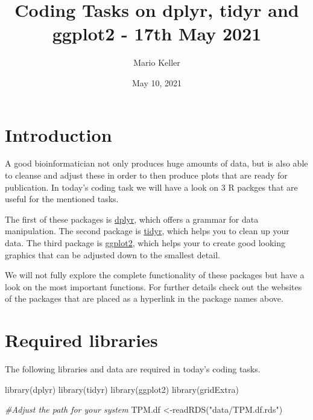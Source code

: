 \documentclass[
  7pt,
]{article}
\title{Coding Tasks on dplyr, tidyr and ggplot2 - 17th May 2021}
\author{Mario Keller}
\date{May 10, 2021}
\newenvironment{Shaded}{\begin{snugshade}}{\end{snugshade}}
\newcommand{\CommentTok}[1]{\textcolor[rgb]{0.56,0.35,0.01}{\textit{#1}}}
\newcommand{\FunctionTok}[1]{\textcolor[rgb]{0.00,0.00,0.00}{#1}}
\newcommand{\NormalTok}[1]{#1}
\newcommand{\OtherTok}[1]{\textcolor[rgb]{0.56,0.35,0.01}{#1}}
\newcommand{\StringTok}[1]{\textcolor[rgb]{0.31,0.60,0.02}{#1}}
\begin{document}
\maketitle

{
\setcounter{tocdepth}{3}
\tableofcontents
}
\pagebreak

\hypertarget{introduction}{%
\section{Introduction}\label{introduction}}

A good bioinformatician not only produces huge amounts of data, but is
also able to cleanse and adjust these in order to then produce plots
that are ready for publication. In today's coding task we will have a
look on 3 R packges that are useful for the mentioned tasks.

The first of these packages is
\href{https://dplyr.tidyverse.org/}{dplyr}, which offers a grammar for
data manipulation. The second package is
\href{https://tidyr.tidyverse.org/}{tidyr}, which helps you to clean up
your data. The third package is
\href{https://ggplot2.tidyverse.org/}{ggplot2}, which helps your to
create good looking graphics that can be adjusted down to the smallest
detail.

We will not fully explore the complete functionality of these packages
but have a look on the most important functions. For further details
check out the websites of the packages that are placed as a hyperlink in
the package names above.

\hypertarget{required-libraries}{%
\section{Required libraries}\label{required-libraries}}

The following libraries and data are required in today's coding tasks.

\begin{Shaded}
\begin{Highlighting}[]
\FunctionTok{library}\NormalTok{(dplyr)}
\FunctionTok{library}\NormalTok{(tidyr)}
\FunctionTok{library}\NormalTok{(ggplot2)}
\FunctionTok{library}\NormalTok{(gridExtra)}

\CommentTok{\#Adjust the path for your system}
\NormalTok{TPM.df }\OtherTok{\textless{}{-}}\FunctionTok{readRDS}\NormalTok{(}\StringTok{"data/TPM.df.rds"}\NormalTok{) }
\end{Highlighting}
\end{Shaded}
\end{document}
